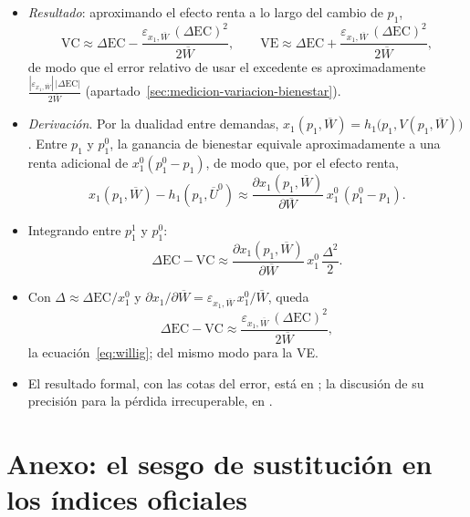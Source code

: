 \documentclass[11pt]{article}
\begin{document}
\begin{itemize}
\item \emph{Resultado}: aproximando el efecto renta a lo largo del cambio de $p_1$,
  \begin{equation}
  \mathrm{VC}\approx\Delta\mathrm{EC}-\frac{\varepsilon_{x_1,\overline{W}}\,(\Delta\mathrm{EC})^2}{2\overline{W}},\qquad \mathrm{VE}\approx\Delta\mathrm{EC}+\frac{\varepsilon_{x_1,\overline{W}}\,(\Delta\mathrm{EC})^2}{2\overline{W}}, \label{eq:willig}
  \end{equation}
  de modo que el error relativo de usar el excedente es aproximadamente $\frac{|\varepsilon_{x_1,\overline{W}}|\,|\Delta\mathrm{EC}|}{2\overline{W}}$ (apartado~\ref{sec:medicion-variacion-bienestar}).
\item \emph{Derivación}. Por la dualidad entre demandas, $x_1(p_1,\overline{W})=h_1\big(p_1,V(p_1,\overline{W})\big)$. Entre $p_1$ y $p_1^0$, la ganancia de bienestar equivale aproximadamente a una renta adicional de $x_1^0(p_1^0-p_1)$, de modo que, por el efecto renta,
  \begin{equation*}
  x_1(p_1,\overline{W})-h_1(p_1,\overline{U}^0)\approx\frac{\partial x_1(p_1,\overline{W})}{\partial\overline{W}}\,x_1^0\,(p_1^0-p_1).
  \end{equation*}
\item Integrando entre $p_1^1$ y $p_1^0$:
  \begin{equation*}
  \Delta\mathrm{EC}-\mathrm{VC}\approx\frac{\partial x_1(p_1,\overline{W})}{\partial\overline{W}}\,x_1^0\,\frac{\Delta^2}{2}.
  \end{equation*}
\item Con $\Delta\approx\Delta\mathrm{EC}/x_1^0$ y $\partial x_1/\partial\overline{W}=\varepsilon_{x_1,\overline{W}}\,x_1^0/\overline{W}$, queda
  \begin{equation*}
  \Delta\mathrm{EC}-\mathrm{VC}\approx\frac{\varepsilon_{x_1,\overline{W}}\,(\Delta\mathrm{EC})^2}{2\overline{W}},
  \end{equation*}
  la ecuación~\eqref{eq:willig}; del mismo modo para la VE.\findemo
\item El resultado formal, con las cotas del error, está en \textcite{Willig1976Surplus}; la discusión de su precisión para la pérdida irrecuperable, en \textcite{Hausman1981Exact}.
\end{itemize}

\section{Anexo: el sesgo de sustitución en los índices oficiales}\label{anexo:indices}
\end{document}

